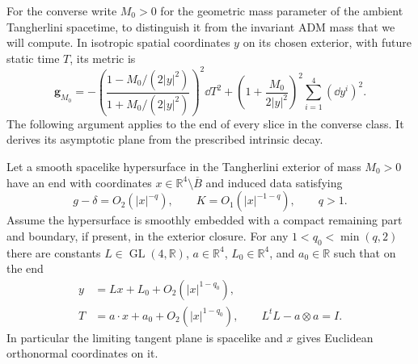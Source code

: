 For the converse write $M_0>0$ for the geometric mass parameter of the
ambient Tangherlini spacetime, to distinguish it from the invariant ADM mass
that we will compute.  In isotropic spatial coordinates $y$ on its chosen
exterior, with future static time $T$, its metric is
\begin{equation}
 \mathbf g_{M_0}
 =-\left(\frac{1-M_0/(2|y|^2)}{1+M_0/(2|y|^2)}\right)^2\dd T^2
   +\left(1+\frac{M_0}{2|y|^2}\right)^2
       \sum_{i=1}^4(\dd y^i)^2.
 \label{rig4:rec:isotropic-spacetime}
\end{equation}
The following argument applies to the end of every slice in the converse
class.  It derives its asymptotic plane from the prescribed intrinsic decay.

\begin{lemma}
\label{rig4:rec:asymptotic-plane}
Let a smooth spacelike hypersurface in the Tangherlini exterior of mass
$M_0>0$ have an end with coordinates $x\in\mathbb R^4\setminus\overline B$
and induced data satisfying
\[
 g-\delta=O_2(|x|^{-q}),\qquad K=O_1(|x|^{-1-q}),\qquad q>1.
\]
Assume the hypersurface is smoothly embedded with a compact remaining part
and boundary, if present, in the exterior closure.  For any
$1<q_0<\min(q,2)$ there are constants
$L\in\operatorname{GL}(4,\mathbb R)$, $a\in\mathbb R^4$,
$L_0\in\mathbb R^4$, and $a_0\in\mathbb R$ such that on the end
\begin{equation}
 \begin{split}
 y&=Lx+L_0+O_2(|x|^{1-q_0}),\\
 T&=a\cdot x+a_0+O_2(|x|^{1-q_0}),\qquad
 L^tL-a\otimes a=I.
 \end{split}
 \label{rig4:rec:affine-plane}
\end{equation}
In particular the limiting tangent plane is spacelike and $x$ gives
Euclidean orthonormal coordinates on it.
\end{lemma}

